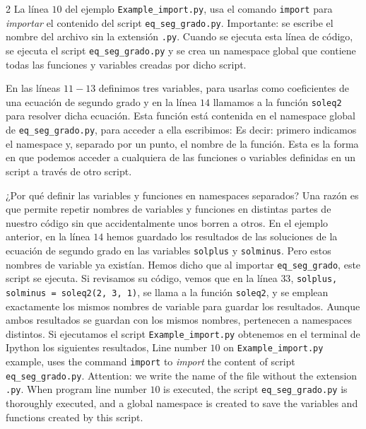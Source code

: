 \begin{paracol}{2}
La línea $10$ del ejemplo \texttt{Example_import.py}, usa el comando \texttt{import} para \emph{importar} el contenido del script \texttt{eq_seg_grado.py}. Importante: se escribe el nombre del archivo sin la extensión \texttt{.py}. Cuando se ejecuta esta línea de código, se ejecuta el script \texttt{eq_seg_grado.py} y se crea un namespace global que contiene todas las funciones y variables creadas por dicho script.

En las líneas $11-13$ definimos tres variables, para usarlas como coeficientes de una ecuación de segundo grado y en la línea $14$ llamamos a la función \texttt{soleq2} para resolver dicha ecuación. Esta función está contenida en el namespace global de \texttt{eq_seg_grado.py}, para acceder a ella escribimos:
Es decir: primero indicamos el namespace y, separado por un punto, el nombre de la función. Esta es la forma en que podemos acceder a cualquiera de las funciones o variables definidas en un script a través de otro script.

¿Por qué definir las variables y funciones en namespaces separados? Una razón es que permite repetir nombres de variables y funciones en distintas partes de nuestro código sin que accidentalmente unos borren a otros. En el ejemplo anterior, en la línea $14$ hemos guardado los resultados de las soluciones de la ecuación de segundo grado en las variables \texttt{solplus} y \texttt{solminus}. Pero estos nombres de variable ya existían. Hemos dicho que al importar \texttt{eq_seg_grado}, este script se ejecuta. Si revisamos su código, vemos que en la línea $33$, \texttt{solplus, solminus = soleq2(2, 3, 1)}, se llama a la función \texttt{soleq2}, y se emplean exactamente los mismos nombres de variable para guardar los resultados. Aunque ambos resultados se guardan con los mismos nombres, pertenecen a namespaces distintos. Si ejecutamos el script \texttt{Example_import.py} obtenemos en el terminal de Ipython los siguientes resultados,
\switchcolumn
Line number $10$ on \texttt{Example_import.py} example, uses the command \texttt{import} to \emph{import} the content of script \texttt{eq_seg_grado.py}. Attention: we write the name of the file without the extension \texttt{.py}. When program line number $10$ is executed, the script \texttt{eq_seg_grado.py} is thoroughly executed, and a global namespace is created to save the variables and functions created by this script.


\end{paracol}
